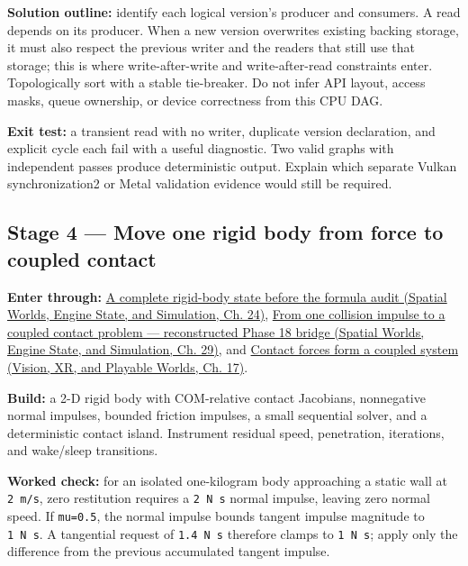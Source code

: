 \textbf{Solution outline:} identify each logical version's producer and consumers. A read depends on its producer. When a new version overwrites existing backing storage, it must also respect the previous writer and the readers that still use that storage; this is where write-after-write and write-after-read constraints enter. Topologically sort with a stable tie-breaker. Do not infer API layout, access masks, queue ownership, or device correctness from this CPU DAG.

\textbf{Exit test:} a transient read with no writer, duplicate version declaration, and explicit cycle each fail with a useful diagnostic. Two valid graphs with independent passes produce deterministic output. Explain which separate Vulkan synchronization2 or Metal validation evidence would still be required.

\subsection{Stage 4 --- Move one rigid body from force to coupled contact}\label{06-engine-ii-ch042-stage-4-move-one-rigid-body-from-force-to-coupled-contact}

\hypertarget{06-engine-ii-ch042-stage-4-move-one-rigid-body-from-force-to-coupled-contact}{}

\textbf{Enter through:} \href{../05-Spatial-Worlds-Engine-State-and-Simulation/main.pdf\#nameddest=06-engine-ii-ch035-the-complete-kairo-state-so-far}{A complete rigid-body state before the formula audit (Spatial Worlds, Engine State, and Simulation, Ch. 24)}, \href{../05-Spatial-Worlds-Engine-State-and-Simulation/main.pdf\#nameddest=06-engine-ii-ch040-from-one-collision-impulse-to-a-coupled-contact-problem-reconstructed-phase-18-bridge}{From one collision impulse to a coupled contact problem --- reconstructed Phase 18 bridge (Spatial Worlds, Engine State, and Simulation, Ch. 29)}, and \href{../07-Vision-XR-and-Playable-Worlds/main.pdf\#nameddest=06-engine-ii-ch046-contact-forces-form-a-coupled-system}{Contact forces form a coupled system (Vision, XR, and Playable Worlds, Ch. 17)}.

\textbf{Build:} a 2-D rigid body with COM-relative contact Jacobians, nonnegative normal impulses, bounded friction impulses, a small sequential solver, and a deterministic contact island. Instrument residual speed, penetration, iterations, and wake/sleep transitions.

\textbf{Worked check:} for an isolated one-kilogram body approaching a static wall at \texttt{2\ m/s}, zero restitution requires a \texttt{2\ N\ s} normal impulse, leaving zero normal speed. If \texttt{mu=0.5}, the normal impulse bounds tangent impulse magnitude to \texttt{1\ N\ s}. A tangential request of \texttt{1.4\ N\ s} therefore clamps to \texttt{1\ N\ s}; apply only the difference from the previous accumulated tangent impulse.

